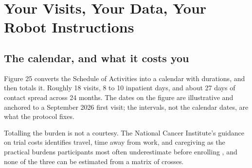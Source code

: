 \section{Your Visits, Your Data, Your Robot Instructions}

\subsection{The calendar, and what it costs you}

Figure 25 converts the Schedule of Activities into a calendar with durations,
and then totals it. Roughly 18 visits, 8 to 10 inpatient days, and about 27 days
of contact spread across 24 months. The dates on the figure are illustrative and
anchored to a September 2026 first visit; the intervals, not the calendar dates,
are what the protocol fixes.

Totalling the burden is not a courtesy. The National Cancer Institute's guidance
on trial costs identifies travel, time away from work, and caregiving as the
practical burdens participants most often underestimate before enrolling
\cite{NCICosts2024}, and none of the three can be estimated from a matrix of
crosses.

